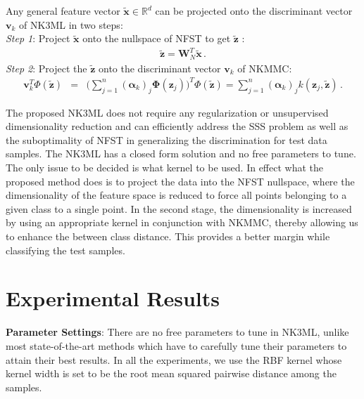 \documentclass[runningheads]{llncs}
\begin{document}
Any general feature vector $\widetilde{\mathbf{x}} \in \mathbb{R}^d$ can be projected onto the discriminant vector $\mathbf{v}_k$ of NK3ML in two steps:\\
\textit{Step 1}: Project $\widetilde{\mathbf{x}}$ onto the nullspace of NFST to get $\widetilde{\mathbf{z}}$ :
\begin{eqnarray}
\widetilde{\mathbf{z}} = \mathbf{W}^T_{N} \widetilde{\mathbf{x}} \,.
\end{eqnarray}
\textit{Step 2}: Project the $\widetilde{\mathbf{z}} $ onto the discriminant vector $\mathbf{v}_k$ of NKMMC:
\begin{eqnarray}
\mathbf{v}_k^T \Phi(\widetilde{\mathbf{z}}) &=& \Big( \sum\limits_{j = 1}^{n} (\bm{\alpha}_{k})_j \mathbf{\Phi}(\mathbf{z}_j)\Big)^T \Phi(\widetilde{\mathbf{z}})
= \sum\limits_{j = 1}^{n} (\bm{\alpha}_{k})_j  k(\mathbf{z}_j,\widetilde{\mathbf{z}}) \,.
\end{eqnarray}

The proposed NK3ML does not require any regularization or unsupervised dimensionality reduction and can efficiently address the SSS problem as well as the suboptimality of NFST in generalizing the discrimination for test data samples. The NK3ML has a closed form solution and no free parameters to tune. The only issue to be decided is what kernel to be used. In effect what the proposed method does is to project the data into the NFST nullspace, where the dimensionality of the feature space is reduced to force all points belonging to a given class to a single point. In the second stage, the dimensionality is increased by using an appropriate kernel in conjunction with NKMMC, thereby allowing us to enhance the between class distance. This provides a better margin while classifying the test samples.



\section{Experimental Results}
\label{sec:Exp}
\noindent\textbf{Parameter Settings}: There are no free parameters to tune in NK3ML, unlike most state-of-the-art methods which have to carefully tune their parameters to attain their best results. In all the experiments, we use the RBF kernel whose kernel width is set to be the root mean squared pairwise distance among the samples.
\end{document}
